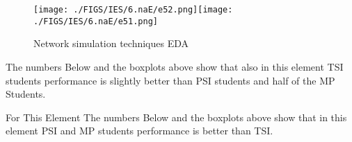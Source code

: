 \documentclass[12pt]{extreport}
\begin{document}
\begin{figure}[H]
	\centering
	\texttt{[image: ./FIGS/IES/6.naE/e52.png]}\texttt{[image: ./FIGS/IES/6.naE/e51.png]}
	\caption{Network simulation techniques EDA}
	\label{fig:76}
\end{figure}

The numbers Below and the boxplots above show that also in this element  TSI students performance is slightly better than PSI students and half of the MP Students.

For This Element The numbers Below and the boxplots above show that in this element  PSI and MP students performance is  better than TSI.

\begin{comment}
\subparagraph{Interpretation of the Box-plots:}
For This Element 

\begin{comment}
\begin{enumerate}	
	\item The MP Class Box-Plot:
	\begin{enumerate}
		\item MAX = a {} {} {} {} {} {} {} {} UQ = b {} {} {} {} {} {} {} {} Median = c
		\item LQ = d {} {} {} {} {} {} {} {}  MIN =	l {} {} {} {} {} {} {} {}  IQR = e - f = g
	\end{enumerate}
	\item The PSI Class Box-Plot:
	\begin{enumerate}
		\item MAX = a {} {} {} {} {} {} {} {} UQ = b {} {} {} {} {} {} {} {} Median = c
		\item LQ = d {} {} {} {} {} {} {} {}  MIN =	e {} {} {} {} {} {} {} {} IQR = f - g = h	
	\end{enumerate}
	\item The TSI Class Box-Plot:
	\begin{enumerate}
		\item MAX = a {} {} {} {} {} {} {} {} UQ = b {} {} {} {} {} {} {} {} Median = c
		\item LQ = d {} {} {} {} {} {} {} {} MIN = e {} {} {} {} {} {} {} {} IQR = f - g = h	
	\end{enumerate}
\end{enumerate}




\subparagraph{Interpretation of the histogram:}
This Frequency Distribution is (Skeness) with the following descriptive statistics:
\begin{enumerate}
	\item Mean = 
	\item STD = 
	\item Range = a - b = c
	\item IQR = a-b = c 
\end{enumerate}
\end{comment}
\end{document}
